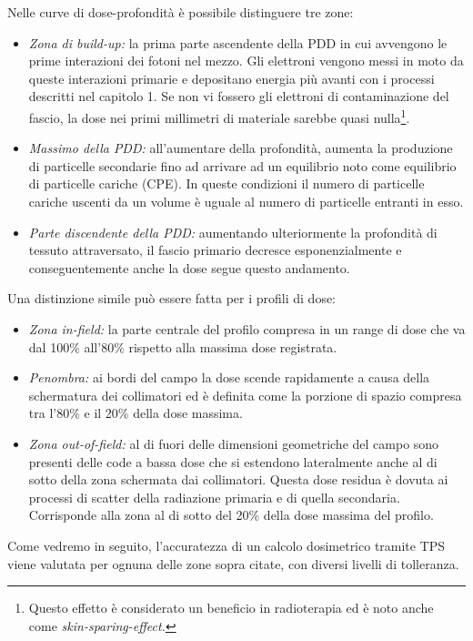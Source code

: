 Nelle curve di dose-profondità è possibile distinguere tre zone:
\begin{itemize}
\item \textit{Zona di build-up:} la prima parte ascendente della PDD in cui avvengono le prime interazioni dei fotoni nel mezzo. Gli elettroni vengono messi in moto da queste interazioni primarie e depositano energia più avanti con i processi descritti nel capitolo 1. Se non vi fossero gli elettroni di contaminazione del fascio, la dose nei primi millimetri di materiale sarebbe quasi nulla\footnote{Questo effetto è considerato un beneficio in radioterapia ed è noto anche come \textit{skin-sparing-effect.}}.
\item \textit{Massimo della PDD:} all'aumentare della profondità, aumenta la produzione di particelle secondarie fino ad arrivare ad un equilibrio noto come equilibrio di particelle cariche (CPE). In queste condizioni il numero di particelle cariche uscenti da un volume è uguale al numero di particelle entranti in esso.
\item \textit{Parte discendente della PDD:} aumentando ulteriormente la profondità di tessuto attraversato, il fascio primario decresce esponenzialmente e conseguentemente anche la dose segue questo andamento.
\end{itemize}

Una distinzione simile può essere fatta per i profili di dose:
\begin{itemize}
\item \textit{Zona in-field:} la parte centrale del profilo compresa in un range di dose che va dal 100\% all'80\% rispetto alla massima dose registrata.
\item \textit{Penombra:} ai bordi del campo la dose scende rapidamente a causa della schermatura dei collimatori ed è definita come la porzione di spazio compresa tra l'80\% e il 20\% della dose massima.
\item \textit{Zona out-of-field:} al di fuori delle dimensioni geometriche del campo sono presenti delle code a bassa dose che si estendono lateralmente anche al di sotto della zona schermata dai collimatori. Questa dose residua è dovuta ai processi di scatter della radiazione primaria e di quella secondaria. Corrisponde alla zona al di sotto del 20\% della dose massima del profilo.
\end{itemize}

Come vedremo in seguito, l'accuratezza di un calcolo dosimetrico tramite TPS viene valutata per ognuna delle zone sopra citate, con diversi livelli di tolleranza. 

